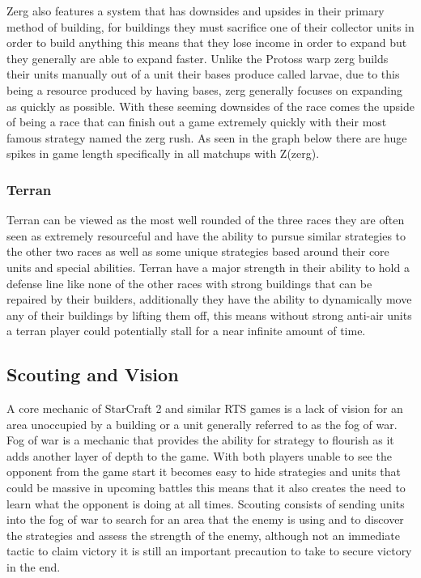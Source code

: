 \documentclass[a4paper,12pt]{report}
\begin{document}
Zerg also features a system that has downsides and upsides in their primary method of building, for buildings they must sacrifice one of their collector units in order to build anything this means that they lose income in order to expand but they generally are able to expand faster. Unlike the Protoss warp  zerg builds their units manually out of a unit their bases produce called larvae, due to this being a resource produced by having bases, zerg generally focuses on expanding as quickly as possible. With these seeming downsides of the race comes the upside of being a race that can finish out a game extremely quickly with their most famous strategy named the zerg rush. As seen in the graph below there are huge spikes in game length specifically in all matchups with Z(zerg).

\subsubsection{Terran}

Terran can be viewed as the most well rounded of the three races they are often seen as extremely resourceful and have the ability to pursue similar strategies to the other two races as well as some unique strategies based around their core units and special abilities. Terran have a major strength in their ability to hold a defense line like none of the other races with strong buildings that can be repaired by their builders, additionally they have the ability to dynamically move any of their buildings by lifting them off, this means without strong anti-air units a terran player could potentially stall for a near infinite amount of time.

\subsection{Scouting and Vision}

A core mechanic of StarCraft 2 and similar RTS games is a lack of vision for an area unoccupied by a building or a unit generally referred to as the fog of war. Fog of war is a mechanic that provides the ability for strategy to flourish as it adds another layer of depth to the game. With both players unable to see the opponent from the game start it becomes easy to hide strategies and units that could be massive in upcoming battles this means that it also creates the need to learn what the opponent is doing at all times. Scouting consists of sending units into the fog of war to search for an area that the enemy is using and to discover the strategies and assess the strength of the enemy, although not an immediate tactic to claim victory it is still an important precaution to take to secure victory in the end.
\end{document}
